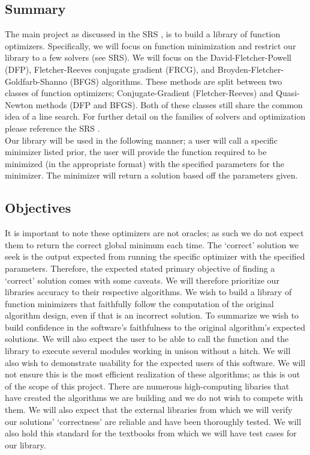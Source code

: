\documentclass[12pt, titlepage]{article}
\begin{document}
\subsection{Summary}
The main project 
as discussed in the SRS \citep{SRS}, is to build a library of function optimizers. Specifically, we will
focus on function minimization and restrict our library to a few solvers (see SRS). We will focus on the 
David-Fletcher-Powell (DFP), Fletcher-Reeves conjugate gradient (FRCG), and Broyden-Fletcher-Goldfarb-Shanno (BFGS) algorithms. 
These methods are split between two classes of function optimizers; Conjugate-Gradient (Fletcher-Reeves) and Quasi-Newton 
methods (DFP and BFGS). Both of these classes still share the common idea of a line search. For further detail on the families
of solvers and optimization please reference the SRS \citep{SRS}.
\\

Our library will be used in the following manner; a user will call a specific minimizer listed prior, the user will provide the 
function required to be minimized (in the appropriate format) with the specified parameters for the minimizer. The minimizer will
return a solution based off the parameters given. 

\subsection{Objectives}

It is important to note these optimizers are not oracles; as such we do not
expect them to return the correct global minimum each time. The `correct' solution we seek is the output expected from running
the specific optimizer with the specified parameters. Therefore, the expected stated primary objective of finding a `correct' 
solution comes with some caveats. We will therefore prioritize our libraries accuracy to their respective algorithms. We wish
to build a library of function minimizers that faithfully follow the computation of the original algorithm design, even if that
is an incorrect solution.  To summarize we wish to build confidence in the software's faithfulness to the original algorithm's 
expected solutions. We will also expect the user to be able to call the function and the library to execute several modules working
in unison without a hitch. 
We will also wish to demonstrate usability for the expected users of this software. We will not ensure this is the most efficient 
realization of these algorithms; as this is out of the scope of this project. There are numerous high-computing libaries that have
created the algorithms we are building and we do not wish to compete with them. We will also expect that the external libraries from 
which we will verify our solutions' `correctness' are reliable and have been thoroughly tested. We will also hold this standard for
the textbooks from which we will have test cases for our library. 
\end{document}
